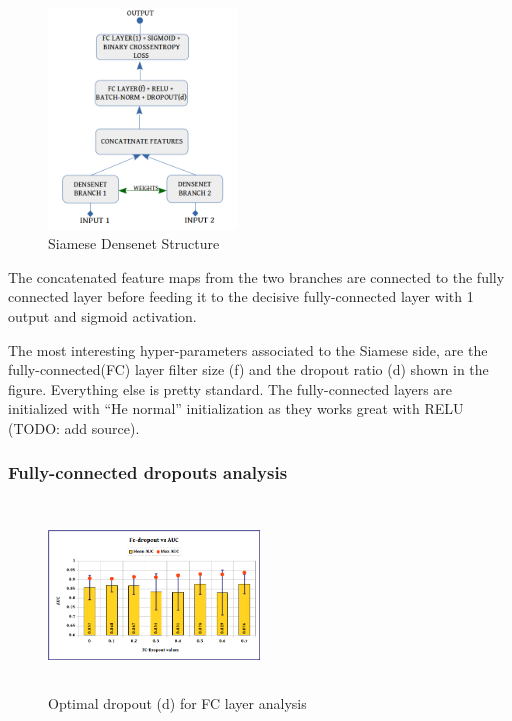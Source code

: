 \begin{figure}
\label{siamese_densenet_structure_wraped}
\includegraphics[width=5cm]{images/densenet/siamese_densenet_structure}
\caption{Siamese Densenet Structure}
\end{figure} 
The concatenated feature maps from the two branches are connected to the fully connected layer before feeding it to the decisive fully-connected layer with 1 output and sigmoid activation.  
\par
The most interesting hyper-parameters associated to the Siamese side, are the fully-connected(FC) layer filter size (f) and the dropout ratio (d) shown in the figure. Everything else is pretty standard.
The fully-connected layers are initialized with “He normal” initialization as they works great with RELU (TODO: add source).
\flushbottom
\newpage
\subsubsection{Fully-connected dropouts analysis}

\begin{figure}[ht]
\centering
\includegraphics[height=5cm,width=0.5\textwidth]{images/densenet/fc_dropout}
\caption{Optimal dropout (d) for FC layer analysis}
\label{fig:fc_dropout}
\end{figure}

